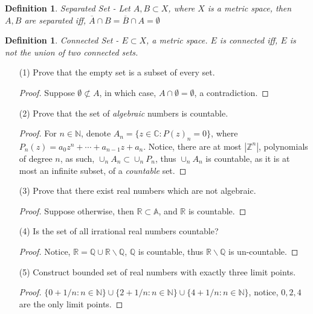 \documentclass{amsart}
\numberwithin{equation}{section}
\theoremstyle{plain}
\newtheorem{dfn}[thm]{Definition}
\theoremstyle{definition}
\begin{document}
\begin{dfn}
  \textit{Separated Set} - Let $A, B \subset X$, where $X$ is a metric space, then $A, B$ are separated
  iff, $\overline{A} \cap B = \overline{B} \cap A = \emptyset$ 
\end{dfn}
\begin{dfn}
  \textit{Connected Set} - $E \subset X$, a metric space. $E$ is \textit{connected} iff,
  $E$ is not the union of two connected sets.
\end{dfn} 

\begin{enumerate}
  \item[(1)] Prove that the empty set is a subset of every set. 
  \begin{proof}
    Suppose $\emptyset \not \subset A$, in which case, $A \cap \emptyset = \emptyset$, a contradiction.
  \end{proof}
  \item[(2)] Prove that the set of \textit{algebraic} numbers is countable.
  \begin{proof}
    For $n \in \mathbb{N}$, denote $A_n = \{z \in \mathbb{C}: P(z)_n = 0 \}$, where $P_n(z) = a_0z^n + \cdots + a_{n-1}z + a_n$. Notice, there are
    at most $|\mathbb{Z}^n|$, polynomials of degree $n$, as such, $\cup_n A_n \subset \cup_n P_n$, thus $\cup_n A_n$ is countable, as it is at most an infinite subset, of a
    \textit{countable} set.
  \end{proof} 
  \item[(3)] Prove that there exist real numbers which are not algebraic.
  \begin{proof}
    Suppose otherwise, then $\mathbb{R} \subset \mathbb{A}$, and $\mathbb{R}$ is countable.
  \end{proof}
  \item[(4)]Is the set of all irrational real numbers countable?
  \begin{proof}
    Notice, $\mathbb{R} = \mathbb{Q} \cup \mathbb{R}\backslash \mathbb{Q}$, $\mathbb{Q}$ is countable, thus $\mathbb{R} \backslash \mathbb{Q}$ is un-countable.
  \end{proof}
  \item[(5)] Construct bounded set of real numbers with exactly three limit points. \\
  \begin{proof}
    $\{0 + 1/n: n \in \mathbb{N} \} \cup \{2 + 1/n: n \in \mathbb{N} \} \cup \{4 + 1/n: n \in \mathbb{N} \}$, notice, $0,2,4$ are the only limit points.
  \end{proof}

\end{enumerate}
\end{document}
